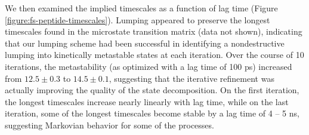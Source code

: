 We then examined the implied timescales as a function of lag time (Figure \ref{figure:fs-peptide-timescales}).
Lumping appeared to preserve the longest timescales found in the microstate transition matrix (data not shown), indicating that our lumping scheme had been successful in identifying a nondestructive lumping into kinetically metastable states at each iteration.
Over the course of 10 iterations, the metastability (as optimized with a lag time of 100 ps) increased from $12.5 \pm 0.3$ to $14.5 \pm 0.1$, suggesting that the iterative refinement was actually improving the quality of the state decomposition.
On the first iteration, the longest timescales increase nearly linearly with lag time, while on the last iteration, some of the longest timescales become stable by a lag time of 4 -- 5 ns, suggesting Markovian behavior for some of the processes.

